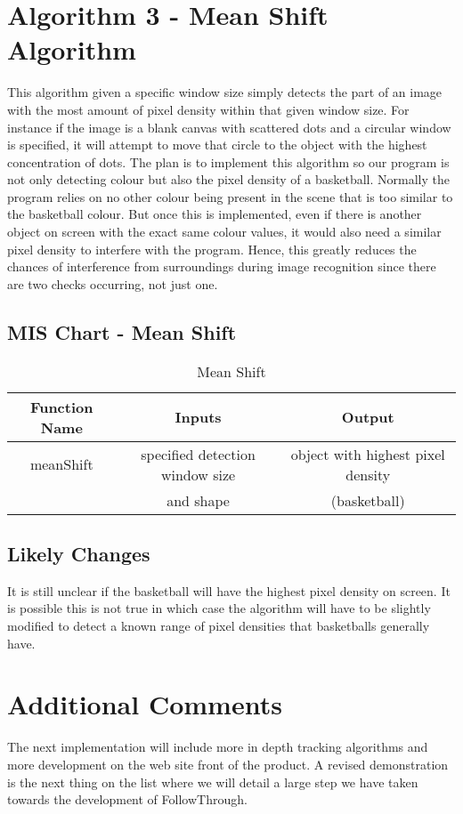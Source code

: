 \section{Algorithm 3 - Mean Shift Algorithm}
This algorithm given a specific window size simply detects the part of an image with the most amount of pixel density within that given window size. For instance if the image is a blank canvas with scattered dots and a circular window is specified, it will attempt to move that circle to the object with the highest concentration of dots. The plan is to implement this algorithm so our program is not only detecting colour but also the pixel density of a basketball.  Normally the program relies on no other colour being present in the scene that is too similar to the basketball colour. But once this is implemented, even if there is another object on screen with the exact same colour values, it would also need a similar pixel density to interfere with the program. Hence, this greatly reduces the chances of interference from surroundings during image recognition since there are two checks occurring, not just one.

\subsection{MIS Chart - Mean Shift}
\begin{table}[h!]
  \centering
  \caption{Mean Shift}
  \label{tab:table12}
  \begin{tabular}{ccc}
    \toprule
    Function Name & Inputs & Output\\
    \midrule
    meanShift & specified detection window size & object with highest pixel density\\
     & and shape & (basketball)\\
    \bottomrule
  \end{tabular}
\end{table}

\subsection{Likely Changes}
It is still unclear if the basketball will have the highest pixel density on screen. It is possible this is not true in which case the algorithm will have to be slightly modified to detect a known range of pixel densities that basketballs generally have. 

\section{Additional Comments}
The next implementation will include more in depth tracking algorithms and more development on the web site front of the product. A revised demonstration is the next thing on the list where we will detail a large step we have taken towards the development of FollowThrough.